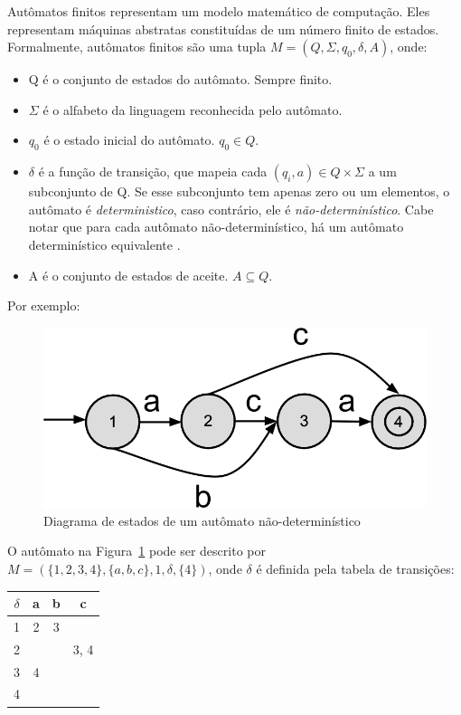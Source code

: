 \documentclass[a4paper,12pt,oneside,onecolumn]{uerj}
\begin{document}
Autômatos finitos representam um modelo matemático de computação. Eles representam máquinas abstratas constituídas de um número finito de estados. Formalmente, autômatos finitos são uma tupla $M = (Q, \Sigma, q_0, \delta, A)$, onde:

\begin{itemize}
    \item Q é o conjunto de estados do autômato. Sempre finito.
    \item $\Sigma$ é o alfabeto da linguagem reconhecida pelo autômato.
    \item $q_0$ é o estado inicial do autômato. $q_0 \in Q$.
    \item $\delta$ é a função de transição, que mapeia cada $(q_i, a) \in Q \times \Sigma$ a um subconjunto de Q. Se esse subconjunto tem apenas zero ou um elementos, o autômato é \emph{deterministico}, caso contrário, ele é \emph{não-determinístico}. Cabe notar que para cada autômato não-determinístico, há um autômato determinístico equivalente \cite{bib:Rabin59}.
    \item A é o conjunto de estados de aceite. $A \subseteq Q$.
\end{itemize}

Por exemplo:

\begin{figure}[!htbp]
  \centering
  \includegraphics[scale=0.3]{figures/exemplo_automato_numerado.png}
  \caption{Diagrama de estados de um autômato não-determinístico}
  \label{fig:exemplo_automato_numerado}
\end{figure}

O autômato na Figura~\ref{fig:exemplo_automato_numerado} pode ser descrito por $M=(\{1,2,3,4\}, \{a,b,c\}, 1, \delta, \{4\})$, onde $\delta$ é definida pela tabela de transições:

\begin{center}
	\begin{tabular}{ c || c | c | c }
		{\bf $\delta$} & {\bf a} & {\bf b} & {\bf c} \\
		\hline 
		\hline 
		1 & 2 & 3 &  \\ 
		\hline 
		2 &   &   & 3, 4 \\ 
		\hline 
		3 & 4 &   &  \\ 
		\hline 
		4 &   &   &  \\ 
	\end{tabular}
\end{center}
\end{document}
